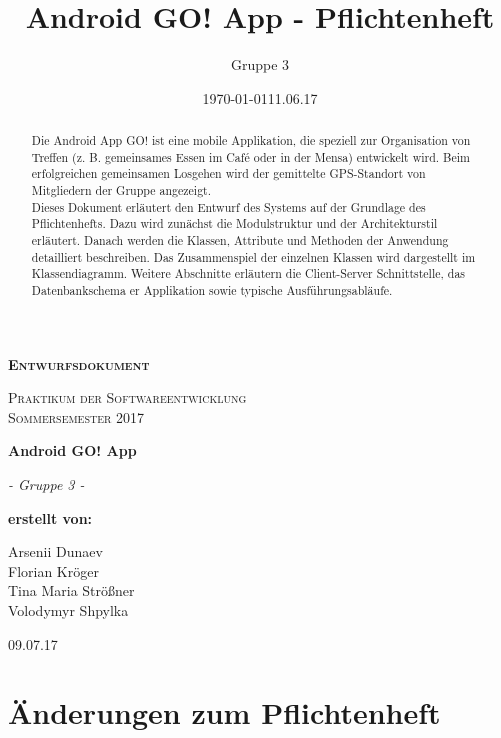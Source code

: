 \documentclass[11pt,a4paper]{article}
\date{\today}
\title{Android GO! App - Pflichtenheft}
\author{Gruppe 3}
\date{11.06.17}
\begin{document}
\begin{titlepage}
	\begin{center}
	{\scshape\LARGE \bfseries Entwurfsdokument \par}
	\vspace{1cm}
	{\scshape\Large Praktikum der Softwareentwicklung \\ Sommersemester 2017\par}
	\vspace{1.5cm}
	{\huge\bfseries Android GO! App\par}
	\vspace{2cm}
	{\Large\itshape - Gruppe 3 -\par}
	\vfill
	{\bfseries erstellt von:\par}
	Arsenii Dunaev \\
	Florian Kröger \\
	Tina Maria Strößner \\
	Volodymyr Shpylka \\	
	\vfill
	{\large 09.07.17 \par}	
	\end{center}
\end{titlepage}

\begin{abstract}
Die Android App GO! ist eine mobile Applikation, die speziell zur Organisation von Treffen (z. B. gemeinsames Essen im Café oder in der Mensa) entwickelt wird. Beim erfolgreichen gemeinsamen Losgehen wird der gemittelte GPS-Standort von Mitgliedern der Gruppe angezeigt.\\

Dieses Dokument erläutert den Entwurf des Systems auf der Grundlage des Pflichtenhefts. Dazu wird zunächst die Modulstruktur und der Architekturstil erläutert. Danach werden die Klassen, Attribute und Methoden der Anwendung detailliert beschreiben. Das Zusammenspiel der einzelnen Klassen wird dargestellt im Klassendiagramm. Weitere Abschnitte erläutern die Client-Server Schnittstelle, das Datenbankschema er Applikation sowie typische Ausführungsabläufe.
\end{abstract}

\newpage

\sloppy
{}
\tableofcontents

\newpage

\section{Änderungen zum Pflichtenheft}
\end{document}
